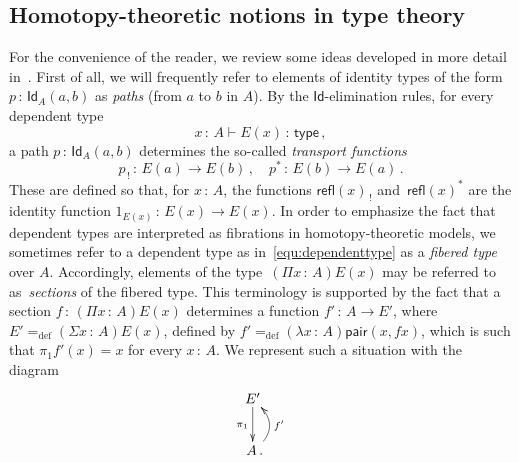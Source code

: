 \documentclass[10pt,a4paper,oneside,reqno]{amsart}
\numberwithin{equation}{section}
\theoremstyle{mythm}
\theoremstyle{mydef}
\theoremstyle{myrmk}
\newcommand{\defeq}{=_{\mathrm{def}}}
\newcommand{\co}{\,{:}\,}
\newcommand{\type}{\mathsf{type}}
\newcommand{\Id}{\mathsf{Id}}
\newcommand{\refl}{\mathsf{refl}}
\newcommand{\pair}{\mathsf{pair}}
\begin{document}
\subsection*{Homotopy-theoretic notions in type theory} For the convenience of the reader, 
we review some ideas developed in more detail in~\cite{hott,VoevodskyV:notts}. 
First of all, we will frequently refer to elements of identity types of the form 
$p \co \Id_A(a,b)$ as \emph{paths} (from $a$ to $b$ in $A$). By the $\Id$-elimination rules, 
for every dependent type
\begin{equation}
\label{equ:dependenttype}
x\co A \vdash E(x) \co \type \, ,
\end{equation} 
a path $p\co \Id_A(a,b)$ determines the so-called \emph{transport functions} 
\[
p_{\, ! } \co E(a) \rightarrow E(b) \, , \quad p^* \co E(b) \to E(a) \, .
\] 
These are defined so that, for $x \co A$, the functions $\refl(x)_{\, !}$ 
and~$\refl(x)^*$ are the identity function $1_{E(x)} \co E(x) \to E(x)$.  In order to emphasize the fact
that dependent types are interpreted as fibrations in homotopy-theoretic models, we sometimes refer to a dependent
type as in~\eqref{equ:dependenttype} as a \emph{fibered type} over $A$. Accordingly, elements of the 
type~$(\Pi x \co A)E(x)$ may be referred to as~\emph{sections} of the fibered type. This terminology is supported by the fact that a section $f \co (\Pi x \co A)E(x)$ determines a function $f' \co A \to E'$, where $E' \defeq (\Sigma x \co A)E(x)$, defined by
$f' \defeq (\lambda x \co A) \pair(x, fx)$, which is such that $ \pi_1 f'(x) = x$ for every $x \co A$.  We represent such a situation with the diagram
  \[
   \xymatrix{
    E' \ar[d]_{\pi_1} \\
    \;  A \, . \ar@/_1pc/[u]_{f'} }
     \]
\end{document}
